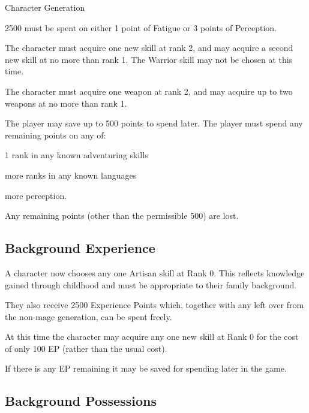 \begin{Chapter}{Character Generation}
\begin{Enumerate}
\item 2500 must be spent on either 1 point of Fatigue 
or 3 points of Perception. 

\item The character must acquire one new skill at rank 2, and may
  acquire a second new skill at no more than rank 1. The Warrior skill
  may not be chosen at this time.

\item The character must acquire one weapon at rank 2, and may acquire
  up to two weapons at no more than rank 1.

\item The player may save up to 500 points to spend later.  The player
  must spend any remaining points on any of:

  \begin{Itemize}

    \item 1 rank in any known adventuring skills  

    \item more ranks in any known languages  

    \item more perception. 

  \end{Itemize}

\end{Enumerate}

Any remaining points (other than the permissible 500) are lost.

\subsection{Background Experience}

A character now chooses any one Artisan skill at Rank 0.  This
reflects knowledge gained through childhood and must be appropriate to
their family background.

They also receive 2500 Experience Points which, together with any left
over from the non-mage generation, can be spent freely.

At this time the character may acquire any one new skill at Rank 0 for
the cost of only 100 EP (rather than the usual cost).

If there is any EP remaining it may be saved for spending later in the
game.

\subsection{Background Possessions}


\end{Chapter}
